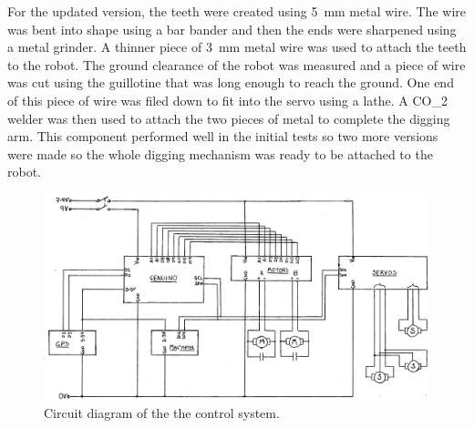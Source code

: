         For the updated version, the teeth were created using \SI{5}{mm} metal wire. The wire was bent into shape using a bar bander and then the ends were sharpened using a metal grinder. A thinner piece of \SI{3}{mm} metal wire was used to attach the teeth to the robot. The ground clearance of the robot was measured and a piece of wire was cut using the guillotine that was long enough to reach the  ground. One end of this piece of wire was filed down to fit into the servo using a lathe. A CO_2 welder was then used to attach the two pieces of metal to complete the digging arm. This component performed well in the initial tests so two more versions were         made so the whole digging mechanism was ready to be attached to the robot.


    \begin{figure}
        \centering
        \includegraphics[width=\textwidth]{Files/circuit_diagram}
        \caption{Circuit diagram of the the control system.}
        \label{fig:circuit diagram}
    \end{figure}




